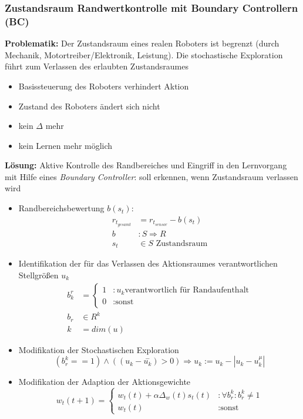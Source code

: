 \subsubsection{Zustandsraum Randwertkontrolle mit Boundary Controllern (BC)}
\textbf{Problematik:} Der Zustandsraum eines realen Roboters ist begrenzt (durch Mechanik, Motortreiber/Elektronik, Leistung). Die stochastische Exploration führt zum Verlassen des erlaubten Zustandsraumes
\begin{itemize}
	\item Basissteuerung des Roboters verhindert Aktion
	\item Zustand des Roboters ändert sich nicht
	\item kein $\Delta$ mehr
	\item kein Lernen mehr möglich
\end{itemize}
\textbf{Lösung:} Aktive Kontrolle des Randbereiches und Eingriff in den Lernvorgang mit Hilfe eines \emph{Boundary Controller}: soll erkennen, wenn Zustandsraum verlassen wird
\begin{itemize}
	\item Randbereichsbewertung $b(s_t)$:
	\begin{align*}
		r_{t_{gesamt}} &= r_{t_{sensor}} - b(s_t) \\
		b &: S \Rightarrow R \\
		s_t & \in S \text{ Zustandsraum}
	\end{align*}
	\item Identifikation der für das Verlassen des Aktionsraumes verantwortlichen Stellgrößen $u_k$
	\begin{align*}
		b_k^r &=
		\begin{cases}
			1 &: u_k \text{verantwortlich für Randaufenthalt} \\
			0 &: \text{sonst}
		\end{cases} \\
		b_r & \in R^k \\
		k &= dim(u)
	\end{align*}
	\item Modifikation der Stochastischen Exploration
	\begin{equation*}
		(b_r^k == 1) \wedge ((u_k - \overset{-}{u_k}) > 0) \Rightarrow u_k := u_k - |u_k - u_k^{\mu}|
	\end{equation*}
	\item Modifikation der Adaption der Aktionsgewichte
	\begin{equation*}
		w_t(t+1) =
		\begin{cases}
			w_t(t) + \alpha \Delta_w(t)s_t(t) &: \forall b_r^k : b_r^k \neq 1 \\
			w_t(t) &: \text{sonst}
		\end{cases}
	\end{equation*}
\end{itemize}

